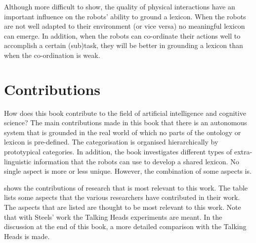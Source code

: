 Although more difficult to show, the quality of physical interactions have an important influence on the robots' ability to ground a lexicon. When the robots are not well adapted to their environment (or vice versa) no meaningful lexicon can emerge. In addition, when the robots can co-ordinate their actions well to accomplish a certain (sub)task, they will be better in grounding a lexicon than when the co-ordination is weak.

\section{Contributions}

How does this book contribute to the field of artificial intelligence and cognitive science? The main contributions made in this book that there is an autonomous system that is grounded in the real world of which no parts of the ontology or lexicon is pre-defined. The categorisation is organised hierarchically by prototypical categories. In addition, the book investigates different types of extra-linguistic information that the robots can use to develop a shared lexicon. No single aspect is more or less unique. However, the combination of some aspects is.

 shows the contributions of research that is most relevant to this work. The table lists some aspects that the various researchers have contributed in their work. The aspects that are listed are thought to be most relevant to this work. Note that with Steels' work the Talking Heads experiments are meant. In the discussion at the end of this book, a more detailed comparison with the Talking Heads is made.

